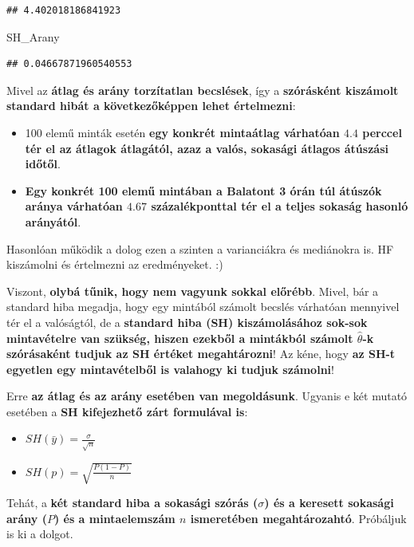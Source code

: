 \documentclass[
]{book}
\newenvironment{Shaded}{\begin{snugshade}}{\end{snugshade}}
\newcommand{\NormalTok}[1]{#1}
\providecommand{\tightlist}{%
  \setlength{\itemsep}{0pt}\setlength{\parskip}{0pt}}
\begin{document}
\begin{verbatim}
## 4.402018186841923
\end{verbatim}

\begin{Shaded}
\begin{Highlighting}[]
\NormalTok{SH\_Arany}
\end{Highlighting}
\end{Shaded}

\begin{verbatim}
## 0.04667871960540553
\end{verbatim}

Mivel az \textbf{átlag és arány torzítatlan becslések}, így a \textbf{szórásként kiszámolt standard hibát a következőképpen lehet értelmezni}:

\begin{itemize}
\tightlist
\item
  100 elemű minták esetén \textbf{egy konkrét mintaátlag várhatóan \(4.4\) perccel tér el az átlagok átlagától, azaz a valós, sokasági átlagos átúszási időtől}.
\item
  \textbf{Egy konkrét 100 elemű mintában a Balatont 3 órán túl átúszók aránya várhatóan \(4.67\) százalékponttal tér el a teljes sokaság hasonló arányától}.
\end{itemize}

Hasonlóan működik a dolog ezen a szinten a varianciákra és mediánokra is. HF kiszámolni és értelmezni az eredményeket. :)

Viszont, \textbf{olybá tűnik, hogy nem vagyunk sokkal előrébb}. Mivel, bár a standard hiba megadja, hogy egy mintából számolt becslés várhatóan mennyivel tér el a valóságtól, de a \textbf{standard hiba (SH) kiszámolásához sok-sok mintavételre van szükség, hiszen ezekből a mintákból számolt \(\hat{\theta}\)-k szórásaként tudjuk az SH értéket megahtározni}!
Az kéne, hogy \textbf{az SH-t egyetlen egy mintavételből is valahogy ki tudjuk számolni}!

Erre \textbf{az átlag és az arány esetében van megoldásunk}. Ugyanis e két mutató esetében a \textbf{SH kifejezhető zárt formulával is}:

\begin{itemize}
\tightlist
\item
  \(SH(\bar{y})=\frac{\sigma}{\sqrt{n}}\)
\item
  \(SH(p)=\sqrt{\frac{P(1-P)}{n}}\)
\end{itemize}

Tehát, a \textbf{két standard hiba a sokasági szórás (\(\sigma\)) és a keresett sokasági arány (\(P\)) és a mintaelemszám \(n\) ismeretében megahtározahtó}. Próbáljuk is ki a dolgot.
\end{document}
